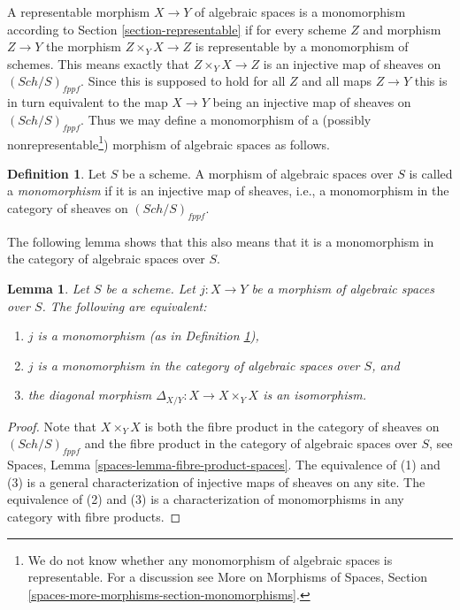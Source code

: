 \documentclass{stacks-project}
\theoremstyle{plain}
\newtheorem{lemma}[subsection]{Lemma}
\theoremstyle{definition}
\newtheorem{definition}[subsection]{Definition}
\theoremstyle{remark}
\numberwithin{equation}{subsection}
\def\Sch{\mathit{Sch}}
\begin{document}
\noindent
A representable morphism $X \to Y$ of algebraic spaces is a monomorphism
according to Section \ref{section-representable} if for every scheme
$Z$ and morphism $Z \to Y$ the morphism $Z \times_Y X \to Z$
is representable by a monomorphism of schemes.
This means exactly that $Z \times_Y X \to Z$
is an injective map of sheaves on $(\Sch/S)_{fppf}$. Since this
is supposed to hold for all $Z$ and all maps $Z \to Y$ this is in turn
equivalent to the map $X \to Y$ being an injective map of sheaves on
$(\Sch/S)_{fppf}$. Thus we may define a monomorphism of a (possibly
nonrepresentable\footnote{We do not know whether any monomorphism
of algebraic spaces is representable. For a discussion see
More on Morphisms of Spaces, Section
\ref{spaces-more-morphisms-section-monomorphisms}.})
morphism of algebraic spaces as follows.

\begin{definition}
\label{definition-monomorphism}
Let $S$ be a scheme.
A morphism of algebraic spaces over $S$ is called a {\it monomorphism}
if it is an injective map of sheaves, i.e., a monomorphism in the category
of sheaves on $(\Sch/S)_{fppf}$.
\end{definition}

\noindent
The following lemma shows that this also means that it is a monomorphism
in the category of algebraic spaces over $S$.

\begin{lemma}
\label{lemma-monomorphism}
Let $S$ be a scheme.
Let $j : X \to Y$ be a morphism of algebraic spaces over $S$.
The following are equivalent:
\begin{enumerate}
\item $j$ is a monomorphism (as in Definition \ref{definition-monomorphism}),
\item $j$ is a monomorphism in the category of algebraic spaces over $S$, and
\item the diagonal morphism $\Delta_{X/Y} : X \to X \times_Y X$ is
an isomorphism.
\end{enumerate}
\end{lemma}

\begin{proof}
Note that $X \times_Y X$ is both the fibre product in the category of
sheaves on $(\Sch/S)_{fppf}$ and the fibre product in the category
of algebraic spaces over $S$, see
Spaces, Lemma \ref{spaces-lemma-fibre-product-spaces}.
The equivalence of (1) and (3) is a general characterization
of injective maps of sheaves on any site.
The equivalence of (2) and (3) is a characterization of monomorphisms
in any category with fibre products.
\end{proof}
\end{document}
